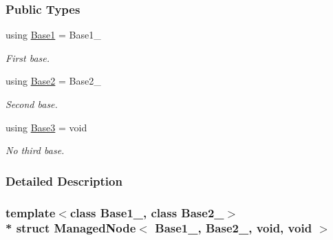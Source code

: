 \subsubsection*{Public Types}
\begin{DoxyCompactItemize}
\item 
using \hyperlink{structManagedNode_3_01Base1___00_01Base2___00_01void_00_01void_01_4_a7ca75556ac4d3155e9742882561e0b23}{Base1} = Base1\+\_\+\hypertarget{structManagedNode_3_01Base1___00_01Base2___00_01void_00_01void_01_4_a7ca75556ac4d3155e9742882561e0b23}{}\label{structManagedNode_3_01Base1___00_01Base2___00_01void_00_01void_01_4_a7ca75556ac4d3155e9742882561e0b23}

\begin{DoxyCompactList}\small\item\em First base. \end{DoxyCompactList}\item 
using \hyperlink{structManagedNode_3_01Base1___00_01Base2___00_01void_00_01void_01_4_a2a11c36d0aef11385f130c0cd44959ef}{Base2} = Base2\+\_\+\hypertarget{structManagedNode_3_01Base1___00_01Base2___00_01void_00_01void_01_4_a2a11c36d0aef11385f130c0cd44959ef}{}\label{structManagedNode_3_01Base1___00_01Base2___00_01void_00_01void_01_4_a2a11c36d0aef11385f130c0cd44959ef}

\begin{DoxyCompactList}\small\item\em Second base. \end{DoxyCompactList}\item 
using \hyperlink{structManagedNode_3_01Base1___00_01Base2___00_01void_00_01void_01_4_a0ea92925c5b5ba5a133852fd8e9321f3}{Base3} = void\hypertarget{structManagedNode_3_01Base1___00_01Base2___00_01void_00_01void_01_4_a0ea92925c5b5ba5a133852fd8e9321f3}{}\label{structManagedNode_3_01Base1___00_01Base2___00_01void_00_01void_01_4_a0ea92925c5b5ba5a133852fd8e9321f3}

\begin{DoxyCompactList}\small\item\em No third base. \end{DoxyCompactList}\end{DoxyCompactItemize}


\subsubsection{Detailed Description}
\subsubsection*{template$<$class Base1\+\_\+, class Base2\+\_\+$>$\\*
struct Managed\+Node$<$ Base1\+\_\+, Base2\+\_\+, void, void $>$}

